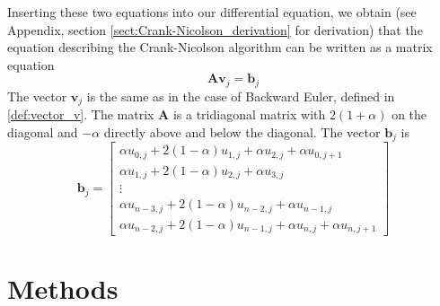 \documentclass[reprint, english,notitlepage,nofootinbib]{revtex4-1}  %
\newcommand{\vc}[1]{\mathbf{#1}}
\begin{document}
Inserting these two equations into our differential equation, we obtain (see Appendix, section \ref{sect:Crank-Nicolson_derivation} for derivation) that the equation describing the Crank-Nicolson algorithm can be written as a matrix equation
\begin{equation}
  \label{eq:Crank-Nicolson_matrix}
  \vc A \vc v_j = \vc b_j
\end{equation}
The vector $\vc v_j$ is the same as in the case of Backward Euler, defined in \eqref{def:vector_v}. The matrix $\vc A$ is a tridiagonal matrix with $2 (1 + \alpha)$ on the diagonal and $-\alpha$ directly above and below the diagonal. The vector $\vc b_j$ is
\begin{equation}
  \label{def:vector_b_CrankNicolson}
  \vc b_j =
  \begin{bmatrix}
    \alpha u_{0, j}  + 2 (1 - \alpha) u_{1,j} + \alpha u_{2, j} + \alpha u_{0, j+1} \\
    \alpha u_{1, j}  + 2 (1 - \alpha) u_{2,j} + \alpha u_{3, j} \\
      \vdots \\
    \alpha u_{n-3, j}  + 2 (1 - \alpha) u_{n-2,j} + \alpha u_{n-1, j} \\
    \alpha u_{n-2, j}  + 2 (1 - \alpha) u_{n-1,j} + \alpha u_{n, j} + \alpha u_{n, j+1}
  \end{bmatrix}
\end{equation}



\section{Methods}
\end{document}
